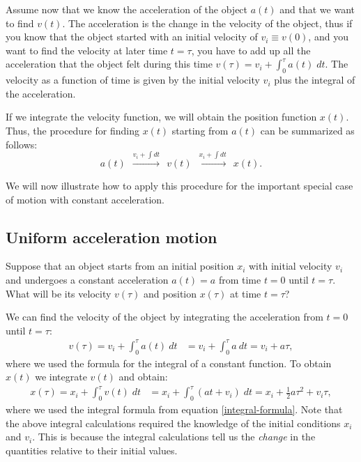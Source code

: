 \documentclass[letterpaper,9pt,journal]{IEEEtran}
\begin{document}
Assume now that we know the acceleration of the object $a(t)$ and that we want to find $v(t)$.
The acceleration is the change in the velocity of the object, 
thus if you know that the object started with an initial velocity of $v_i \equiv v(0)$,
and you want to find the velocity at later time $t=\tau$, 
you have to add up all the acceleration that the object felt 
during this time $v(\tau)=v_i+\int_0^\tau a(t)\;dt$.
The velocity as a function of time is given by the initial 
velocity $v_i$ plus the integral of the acceleration.

If we integrate the velocity function, 
we will  obtain the position function $x(t)$.
Thus, the procedure for finding $x(t)$ starting from $a(t)$ can be summarized as follows:
\[
 a(t) \ \ \overset{v_i + \int\!dt}{\longrightarrow} \ \ v(t) \ \  \overset{x_i+ \int\!dt }{\longrightarrow} \ \ x(t).
\]

We will now illustrate how to apply this procedure for the important special 
case of motion with constant acceleration.

\vspace{-3mm}
\subsection{Uniform acceleration motion}

Suppose that an object starts from an initial position $x_i$ with initial velocity $v_i$ and 
undergoes a constant acceleration $a(t)=a$ from time $t=0$ until $t=\tau$.
What will be its velocity $v(\tau)$ and position $x(\tau)$ at time $t=\tau$?
 
We can find the velocity of the object %
by integrating the acceleration from $t=0$ until $t=\tau$:
\begin{align*}
 v(\tau) = v_i + \int_0^\tau a(t) \ dt &= v_i + \int_0^\tau a \ dt = v_i + a\tau,
\end{align*}
where we used the formula for the integral of a constant function. To obtain $x(t)$ we integrate $v(t)$ and obtain:
\begin{align*}
 x(\tau) = x_i + \int_0^\tau v(t) \; dt &= x_i + \int_0^\tau (at+v_i) \; dt = x_i + \frac{1}{2}a\tau^2 + v_i\tau,
\end{align*}
where we used the integral formula from equation \eqref{integral-formula}.
Note that the above integral calculations required the knowledge of the initial conditions $x_i$ and $v_i$.
This is because the integral calculations tell us the \emph{change} in the quantities relative to their initial values.
\end{document}
